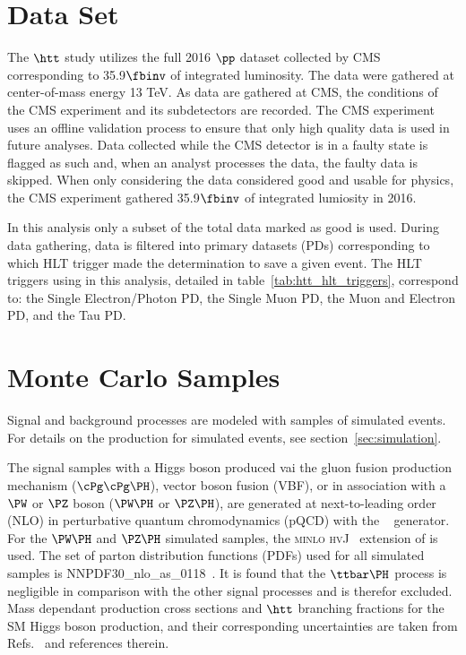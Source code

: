 \section{Data Set}
The $\htt$ study utilizes the full 2016 $\pp$ dataset collected by CMS corresponding to 35.9$\fbinv$ 
of integrated luminosity.  The data were gathered at center-of-mass energy 13 TeV.
As data are gathered at CMS, the conditions of the CMS experiment and its subdetectors are recorded.
The CMS experiment uses an offline validation process to ensure that only high quality
data is used in future analyses.  Data collected while the CMS detector is in a faulty state
is flagged as such and, when an analyst processes the data, the faulty data is skipped.
When only considering the data considered good and usable for physics, the CMS experiment
gathered 35.9$\fbinv$ of integrated lumiosity in 2016.

In this analysis only a subset of the total data marked as good is used.  During data
gathering, data is filtered into primary datasets (PDs) corresponding to which HLT trigger
made the determination to save a given event.  The HLT triggers using in this analysis,
detailed in table~\ref{tab:htt_hlt_triggers}, correspond to: the Single Electron/Photon
PD, the Single Muon PD, the Muon and Electron PD, and the Tau PD.



\section{Monte Carlo Samples}
Signal and background processes are modeled with samples of simulated events.
For details on the production for simulated events, see section~\ref{sec:simulation}.

The signal samples with a Higgs boson produced vai the gluon fusion production
mechanism ($\cPg\cPg\PH$), vector boson fusion (VBF), or in association with a $\PW$ or $\PZ$ boson ($\PW\PH$ or $\PZ\PH$), 
are generated at next-to-leading order (NLO) in perturbative quantum chromodynamics (pQCD) 
with the ~\cite{Nason:2004rx,Frixione:2007vw, Alioli:2010xd, Alioli:2010xa, Alioli:2008tz} 
generator. For the $\PW\PH$ and $\PZ\PH$ simulated samples, the \textsc{minlo hvJ}~\cite{Luisoni:2013kna} 
extension of  is used. The set of parton distribution functions (PDFs) used for all
simulated samples is NNPDF30\_nlo\_as\_0118~\cite{Ball:2011uy}. It is found that the $\ttbar\PH$ 
process is negligible in comparison with the other signal processes and is therefor excluded.
Mass dependant production cross sections and $\htt$ branching fractions for the SM Higgs boson production, 
and their corresponding uncertainties are taken from 
Refs.~\cite{deFlorian:2016spz,Denner:2011mq,Ball:2011mu} and references therein.

